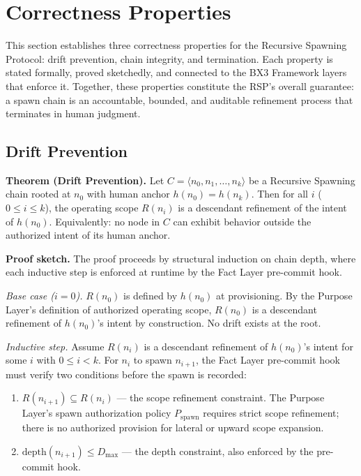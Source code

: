 \section{Correctness Properties}
\label{sec:rs-correctness}

This section establishes three correctness properties for the Recursive Spawning Protocol: drift prevention, chain integrity, and termination. Each property is stated formally, proved sketchedly, and connected to the BX3 Framework layers that enforce it. Together, these properties constitute the RSP's overall guarantee: a spawn chain is an accountable, bounded, and auditable refinement process that terminates in human judgment.

\subsection{Drift Prevention}
\label{sec:rs-drift-prevention}

\textbf{Theorem (Drift Prevention).} Let $C = \langle n_0, n_1, \ldots, n_k \rangle$ be a Recursive Spawning chain rooted at $n_0$ with human anchor $h(n_0) = h(n_k)$. Then for all $i$ ($0 \leq i \leq k$), the operating scope $R(n_i)$ is a descendant refinement of the intent of $h(n_0)$. Equivalently: no node in $C$ can exhibit behavior outside the authorized intent of its human anchor.

\medskip
\textbf{Proof sketch.} The proof proceeds by structural induction on chain depth, where each inductive step is enforced at runtime by the Fact Layer pre-commit hook.

\medskip
\textit{Base case ($i=0$).} $R(n_0)$ is defined by $h(n_0)$ at provisioning. By the Purpose Layer's definition of authorized operating scope, $R(n_0)$ is a descendant refinement of $h(n_0)$'s intent by construction. No drift exists at the root.

\medskip
\textit{Inductive step.} Assume $R(n_i)$ is a descendant refinement of $h(n_0)$'s intent for some $i$ with $0 \leq i < k$. For $n_i$ to spawn $n_{i+1}$, the Fact Layer pre-commit hook must verify two conditions before the spawn is recorded:

\begin{enumerate}
    \item[(a)] $R(n_{i+1}) \subseteq R(n_i)$ — the scope refinement constraint. The Purpose Layer's spawn authorization policy $P_{\text{spawn}}$ requires strict scope refinement; there is no authorized provision for lateral or upward scope expansion.
    \item[(b)] $\text{depth}(n_{i+1}) \leq D_{\text{max}}$ — the depth constraint, also enforced by the pre-commit hook.
\end{enumerate}

